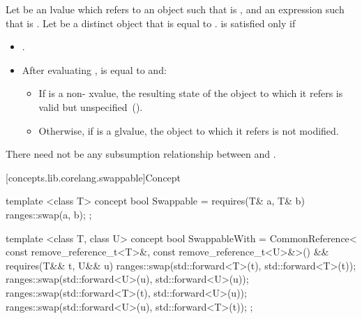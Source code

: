 \begin{itemdescr}
\pnum
Let  be an lvalue which refers to an object  such that
 is , and  an expression such that
 is . Let  be a distinct object that is
equal to .  is satisfied only if

\begin{itemize}
\item {}.

\item After evaluating ,  is equal to  and:

\begin{itemize}
\item If  is a non- xvalue, the resulting state of the
object to which it refers is valid but unspecified~().

\item Otherwise, if  is a glvalue, the object to which it refers is not
modified.
\end{itemize}
\end{itemize}

\pnum
There need not be any subsumption relationship between 
and .
\end{itemdescr}

[concepts.lib.corelang.swappable]{Concept }

%
\begin{itemdecl}
template <class T>
concept bool Swappable =
  requires(T& a, T& b) {
    ranges::swap(a, b);
  };

template <class T, class U>
concept bool SwappableWith =
  CommonReference<
    const remove_reference_t<T>&,
    const remove_reference_t<U>&>() &&
  requires(T&& t, U&& u) {
    ranges::swap(std::forward<T>(t), std::forward<T>(t));
    ranges::swap(std::forward<U>(u), std::forward<U>(u));
    ranges::swap(std::forward<T>(t), std::forward<U>(u));
    ranges::swap(std::forward<U>(u), std::forward<T>(t));
  };
\end{itemdecl}


